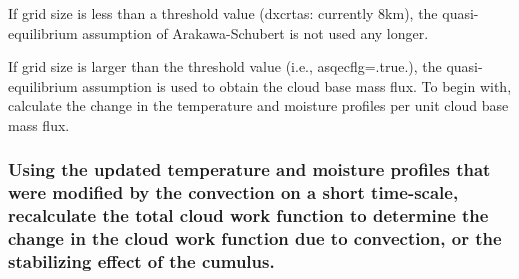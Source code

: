 \begin{DoxyItemize}
\item If grid size is less than a threshold value (dxcrtas\+: currently 8km), the quasi-\/equilibrium assumption of Arakawa-\/\+Schubert is not used any longer.
\item If grid size is larger than the threshold value (i.\+e., asqecflg=.true.), the quasi-\/equilibrium assumption is used to obtain the cloud base mass flux. To begin with, calculate the change in the temperature and moisture profiles per unit cloud base mass flux.
\end{DoxyItemize}

\subsubsection*{Using the updated temperature and moisture profiles that were modified by the convection on a short time-\/scale, recalculate the total cloud work function to determine the change in the cloud work function due to convection, or the stabilizing effect of the cumulus.}


